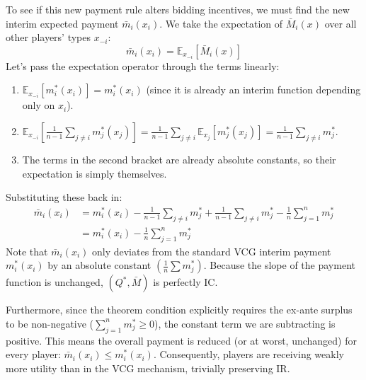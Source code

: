 {\begin{itemize}
To see if this new payment rule alters bidding incentives, we must find the new interim expected payment $\bar{m}_i(x_i)$. We take the expectation of $\bar{M}_i(x)$ over all other players' types $x_{-i}$:
\[
\bar{m}_i(x_i) = \mathbb{E}_{x_{-i}}[\bar{M}_i(x)]
\]
Let's pass the expectation operator through the terms linearly:
\begin{enumerate}
    \item $\mathbb{E}_{x_{-i}}[m_i^*(x_i)] = m_i^*(x_i)$ (since it is already an interim function depending only on $x_i$).
    \item $\mathbb{E}_{x_{-i}} \left[ \frac{1}{n-1}\sum_{j\ne i}m_j^*(x_j) \right] = \frac{1}{n-1}\sum_{j\ne i}\mathbb{E}_{x_j}[m_j^*(x_j)] = \frac{1}{n-1}\sum_{j\ne i}m_j^*$.
    \item The terms in the second bracket are already absolute constants, so their expectation is simply themselves.
\end{enumerate}

Substituting these back in:
\[
\begin{aligned}
  \bar{m}_i(x_i) & = m_i^*(x_i) - {\frac{1}{n-1}\sum_{j\ne i}m_j^*} + {\frac{1}{n-1}\sum_{j\ne i}m_j^*} - \frac{1}{n}\sum_{j = 1}^{n}m_j^*\\
  &  = m_i^*(x_i) - \frac{1}{n}\sum_{j = 1}^{n}m_j^*
\end{aligned}
\]
Note that $\bar{m}_i(x_i)$ only deviates from the standard VCG interim payment $m_i^*(x_i)$ by an absolute constant $\left(\frac{1}{n}\sum m_j^*\right)$. Because the slope of the payment function is unchanged, $(Q^*, \bar{M})$ is perfectly IC.

Furthermore, since the theorem condition explicitly requires the ex-ante surplus to be non-negative ($\sum_{j = 1}^n m_j^* \ge 0$), the constant term we are subtracting is positive. This means the overall payment is reduced (or at worst, unchanged) for every player: $\bar{m}_i(x_i) \le m_i^*(x_i)$. Consequently, players are receiving weakly more utility than in the VCG mechanism, trivially preserving IR.
  \end{itemize}
}

